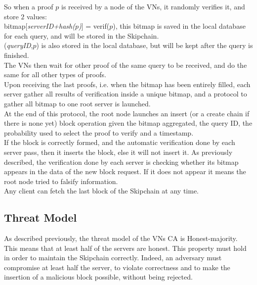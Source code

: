 \documentclass{article}
\begin{document}

So when a proof $p$ is received by a node of the VNs, it randomly verifies it, and store $2$ values:\\
bitmap[\textit{serverID+hash($p$)}] = verif($p$), this bitmap is saved in the local database for each query, and will be stored in the Skipchain.\\
(\textit{queryID},$p$) is also stored in the local database, but will be kept after the query is finished.\\

The VNs then wait for other proof of the same query to be received, and do the same for all other types of proofs.\\
Upon receiving the last proofs, i.e. when the bitmap has been entirely filled, each server gather all results of verification inside a unique bitmap, and a protocol to gather all bitmap to one root server is launched.\\
At the end of this protocol, the root node launches an insert (or a create chain if there is none yet) block operation given the bitmap aggregated, the query ID, the probability used to select the proof to verify and a timestamp.\\
If the block is correctly formed, and the automatic verification done by each server pass, then it inserts the block, else it will not insert it. As previously described, the verification done by each server is checking whether its bitmap appears in the data of the new block request. If it does not appear it means the root node tried to falsify information.\\
Any client can fetch the last block of the Skipchain at any time.
\subsection{Threat Model}
As described previously, the threat model of the VNs CA is Honest-majority. This means that at least half of the servers are honest. This property must hold in order to maintain the Skipchain correctly. Indeed, an adversary must compromise at least half the server, to violate correctness and to make the insertion of a malicious block possible, without being rejected.
\end{document}
